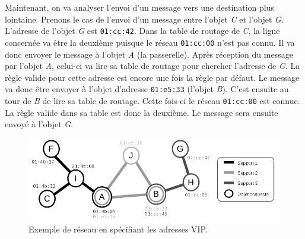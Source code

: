 			Maintenant, on va analyser l'envoi d'un message vers une destination plus lointaine.
			Prenons le cas de l'envoi d'un message entre l'objet \emph{C} et l'objet \emph{G}. 
			L'adresse de l'objet \emph{G} est \texttt{01:cc:42}. Dans la table de routage de \emph{C},
			la ligne concernée va être la deuxième puisque le réseau \texttt{01:cc:00} n'est pas connu.
			Il va donc envoyer le message à l'objet \emph{A} (la passerelle). Après réception du
			message par l'objet \emph{A}, celui-ci va lire sa table de routage pour chercher l'adresse
			de \emph{G}. La règle valide pour cette adresse est encore une fois la règle par défaut. Le
			message va donc être envoyer à l'objet d'adresse \texttt{01:e5:33} (l'objet \emph{B}).
			C'est ensuite au tour de \emph{B} de lire sa table de routage. Cette fois-ci le réseau
			\texttt{01:cc:00} est connue. La règle valide dans sa table est donc la deuxième. Le
			message sera ensuite envoyé à l'objet \emph{G}.
			
			\begin{figure}[!ht]
				\centering
				\includegraphics[width=\textwidth]{img/vip_net.png}
				\caption{Exemple de réseau en spécifiant les adresses VIP.}
				\label{vipNet}
			\end{figure}
			
